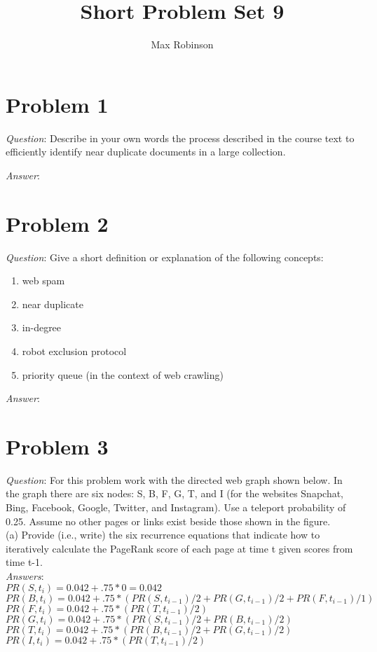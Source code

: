 \documentclass{article}
\begin{document}
\title{Short Problem Set 9}
\author{Max Robinson}
\date{}
\maketitle

\section{Problem 1}
\noindent \textit{Question}:  Describe in your own words the process described in the course text to efficiently identify near duplicate documents in a large collection.
\newline

\noindent
\textit{Answer}:


\section{Problem 2}
\noindent \textit{Question}:  Give a short definition or explanation of the following concepts:
\begin{enumerate}
\item web spam
\item near duplicate
\item in-degree
\item robot exclusion protocol
\item priority queue (in the context of web crawling)
\end{enumerate}


\noindent
\textit{Answer}:


\section{Problem 3}
\noindent
\textit{Question}: For this problem work with the directed web graph shown below. In the graph there are six nodes: S, B, F, G, T, and I (for the websites Snapchat, Bing, Facebook, Google, Twitter, and Instagram). Use a teleport probability of 0.25. Assume no other pages or links exist beside those shown in the figure. \\

\noindent
(a) Provide (i.e., write) the six recurrence equations that indicate how to iteratively calculate the
PageRank score of each page at time t given scores from time t-1.\\

\noindent
\textit{Answers}: \\
$PR(S, t_i) = 0.042 + .75*0 = 0.042$\\
$PR(B, t_i) = 0.042 + .75*(PR(S,t_{i-1})/2 + PR(G,t_{i-1})/2 + PR(F, t_{i-1})/1)$ \\
$PR(F, t_i) = 0.042 + .75*(PR(T,t_{i-1})/2)$ \\
$PR(G, t_i) = 0.042 + .75*(PR(S,t_{i-1})/2 + PR(B,t_{i-1})/2)$ \\
$PR(T, t_i) = 0.042 + .75*(PR(B,t_{i-1})/2 + PR(G,t_{i-1})/2)$ \\
$PR(I, t_i) = 0.042 + .75*(PR(T,t_{i-1})/2)$ \\
\end{document}
